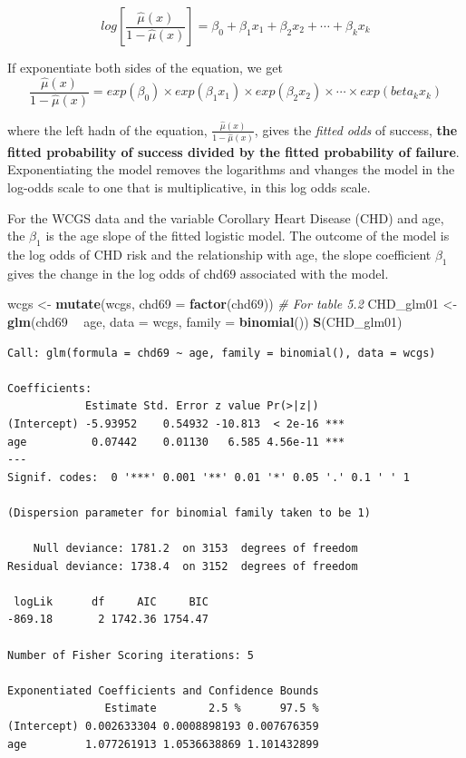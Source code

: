 \documentclass[
]{article}
\newenvironment{Shaded}{\begin{snugshade}}{\end{snugshade}}
\newcommand{\CommentTok}[1]{\textcolor[rgb]{0.56,0.35,0.01}{\textit{#1}}}
\newcommand{\DataTypeTok}[1]{\textcolor[rgb]{0.13,0.29,0.53}{#1}}
\newcommand{\KeywordTok}[1]{\textcolor[rgb]{0.13,0.29,0.53}{\textbf{#1}}}
\newcommand{\NormalTok}[1]{#1}
\newcommand{\OperatorTok}[1]{\textcolor[rgb]{0.81,0.36,0.00}{\textbf{#1}}}
\newcommand{\StringTok}[1]{\textcolor[rgb]{0.31,0.60,0.02}{#1}}
\begin{document}
\[log[\frac{\hat\mu(x)}{1-\hat\mu(x)}] = \beta_0 + \beta_1 x_1 + \beta_2 x_2 + \cdots + \beta_k x_k\]

If exponentiate both sides of the equation, we get
\[\frac{\hat\mu(x)}{1-\hat\mu(x)} = exp(\beta_0) \times exp(\beta_1 x_1) \times exp(\beta_2 x_2) \times \cdots \times exp(beta_k x_k)\]

where the left hadn of the equation,
\(\frac{\hat\mu(x)}{1-\hat\mu(x)}\), gives the \emph{fitted odds} of
success, \textbf{the fitted probability of success divided by the fitted
probability of failure}. Exponentiating the model removes the logarithms
and vhanges the model in the log-odds scale to one that is
multiplicative, in this log odds scale.

For the WCGS data and the variable Corollary Heart Disease (CHD) and
age, the \(\beta_1\) is the age slope of the fitted logistic model. The
outcome of the model is the log odds of CHD risk and the relationship
with age, the slope coefficient \(\beta_1\) gives the change in the log
odds of chd69 associated with the model.

\begin{Shaded}
\begin{Highlighting}[]
\NormalTok{wcgs <-}\StringTok{ }\KeywordTok{mutate}\NormalTok{(wcgs, }\DataTypeTok{chd69 =} \KeywordTok{factor}\NormalTok{(chd69))}
\CommentTok{# For table 5.2}
\NormalTok{CHD_glm01 <-}\StringTok{ }\KeywordTok{glm}\NormalTok{(chd69 }\OperatorTok{~}\StringTok{ }\NormalTok{age, }\DataTypeTok{data =}\NormalTok{ wcgs, }\DataTypeTok{family =} \KeywordTok{binomial}\NormalTok{())}
\KeywordTok{S}\NormalTok{(CHD_glm01)}
\end{Highlighting}
\end{Shaded}

\begin{verbatim}
Call: glm(formula = chd69 ~ age, family = binomial(), data = wcgs)

Coefficients:
            Estimate Std. Error z value Pr(>|z|)    
(Intercept) -5.93952    0.54932 -10.813  < 2e-16 ***
age          0.07442    0.01130   6.585 4.56e-11 ***
---
Signif. codes:  0 '***' 0.001 '**' 0.01 '*' 0.05 '.' 0.1 ' ' 1

(Dispersion parameter for binomial family taken to be 1)

    Null deviance: 1781.2  on 3153  degrees of freedom
Residual deviance: 1738.4  on 3152  degrees of freedom

 logLik      df     AIC     BIC 
-869.18       2 1742.36 1754.47 

Number of Fisher Scoring iterations: 5

Exponentiated Coefficients and Confidence Bounds
               Estimate        2.5 %      97.5 %
(Intercept) 0.002633304 0.0008898193 0.007676359
age         1.077261913 1.0536638869 1.101432899
\end{verbatim}
\end{document}
